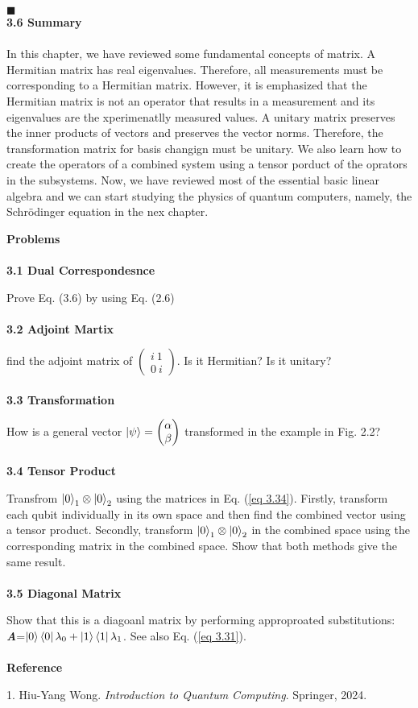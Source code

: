 \documentclass{article}
\begin{document}
\hfill $\blacksquare$
\\
\textbf{\large 3.6 Summary}\\
\\
In this chapter, we have reviewed some fundamental concepts of matrix. A Hermitian matrix
has real eigenvalues. Therefore, all measurements must be corresponding to a Hermitian
matrix. However, it is emphasized that the Hermitian matrix is not an operator that results in a 
measurement and its eigenvalues are the xperimenatlly measured values.
A unitary matrix preserves the inner products of vectors and preserves the vector norms. Therefore,
the transformation matrix for basis changign must be unitary. We also learn how to create the
operators of a combined system using a tensor porduct of the oprators in the subsystems.
Now, we have reviewed most of the essential basic linear algebra and we can start studying the physics
of quantum computers, namely, the Schr\"{o}dinger equation in the nex chapter.

\textbf{\large Problems}\\\\
\textbf{3.1 Dual Correspondesnce}

Prove Eq. (3.6) by using Eq. (2.6)\\\\
\textbf{3.2 Adjoint Martix}

find the adjoint matrix of $\begin{pmatrix}
    i\ 1\\0\ i
\end{pmatrix}$. Is it Hermitian? Is it unitary?\\
\\
\textbf{3.3 Transformation}

How is a general vector $\ket{\psi}=\begin{pmatrix}
    \alpha \\ \beta
\end{pmatrix}$ transformed in the example in Fig. 2.2?\\\\
\textbf{3.4 Tensor Product}

Transfrom $\ket{0}_1\otimes\ket{0}_2$ using the matrices in Eq. (\ref{eq 3.34}). Firstly,
transform each qubit individually in its own space and then find the combined vector using a tensor
product. Secondly, transform $\ket{0}_1\otimes\ket{0}_2$ in the combined space using the corresponding
matrix in the combined space. Show that both methods give the same result.\\\\
\textbf{3.5 Diagonal Matrix}


Show that this is a diagoanl matrix by performing approproated substitutions:
\textit{\textbf{A}}=$\ket{0}\bra{0}\lambda_0+\ket{1}\bra{1}\lambda_1$. See also Eq. (\ref{eq 3.31}).
\\\\
\textbf{\large Reference}


1. Hiu-Yang Wong. \textit{Introduction to Quantum Computing}. Springer, 2024.
\end{document}
